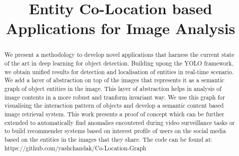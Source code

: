 \documentclass[conference]{IEEEtran}
\begin{document}
%
\title{Entity Co-Location based Applications for Image Analysis}


\author{
\and
{}
}


\maketitle


\begin{abstract}
We present a methodology to develop novel applications that harness the current state of the art in deep learning for object detection. Building upong the YOLO framework, we obtain unified results for detection and localisation of entities in real-time scenario. We add a layer of abstraction on top of the images that represents it as a semantic graph of object entities in the image. This layer of abstraction helps in analysis of image contents in a more robust and tranform invariant way.  We use this graph for visualising the interaction pattern of objects and develop a semantic content based image retrieval system. This work presents a proof of concept which can be further extended to automatically find anomalies encoutered during video surveillance tasks or to build recommender systems based on interest profile of users on the social media based on the entities in the images that they share. The code can be found at:
https://github.com/yashchandak/Co-Location-Graph 

\end{abstract}
\end{document}
